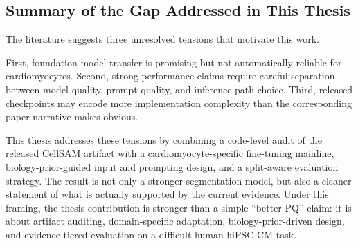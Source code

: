 \subsection{Summary of the Gap Addressed in This Thesis}\label{summary-of-the-gap-addressed-in-this-thesis}

The literature suggests three unresolved tensions that motivate this work.

First, foundation-model transfer is promising but not automatically reliable for cardiomyocytes. Second, strong performance claims require careful separation between model quality, prompt quality, and inference-path choice. Third, released checkpoints may encode more implementation complexity than the corresponding paper narrative makes obvious.

This thesis addresses these tensions by combining a code-level audit of the released CellSAM artifact with a cardiomyocyte-specific fine-tuning mainline, biology-prior-guided input and prompting design, and a split-aware evaluation strategy. The result is not only a stronger segmentation model, but also a cleaner statement of what is actually supported by the current evidence. Under this framing, the thesis contribution is stronger than a simple ``better PQ'' claim: it is about artifact auditing, domain-specific adaptation, biology-prior-driven design, and evidence-tiered evaluation on a difficult human hiPSC-CM task.
